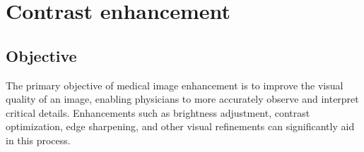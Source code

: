 \chapter{Contrast enhancement}

\section{Objective}
The primary objective of medical image enhancement is to improve the
visual quality of an image, enabling physicians to more accurately
observe and interpret critical details. Enhancements such as
brightness adjustment, contrast optimization, edge sharpening, and
other visual refinements can significantly aid in this process.

